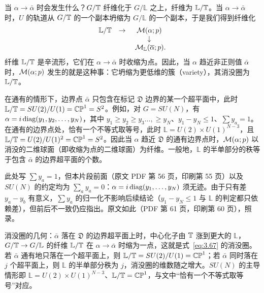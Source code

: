 当 $\alpha\to\bar\alpha$ 时会发生什么？$G/{\mathbb{T}}$ 纤维化于 $G/\mathbb{L}$ 之上，纤维为 $\mathbb{L}/{\mathbb{T}}$。当 $\alpha\to\bar\alpha$ 时，$U$ 的轨道从 $G/{\mathbb{T}}$ 的一个副本坍缩为 $G/\mathbb{L}$ 的一个副本，于是我们得到纤维化
\setcounter{equation}{66}
\begin{equation}\label{eq:3.67}
  \begin{matrix}\mathbb{L}/{\mathbb{T}}&\to& {\mathcal{M}}(\alpha;p)\\
                                &   & \downarrow \\
                                & & ~{\mathcal{M}}_\mathbb{L}(\overline\alpha;p). \end{matrix}
\end{equation}
纤维 $\mathbb{L}/{\mathbb{T}}$ 是辛流形，它们在 $\alpha\to\bar\alpha$ 时收缩为点。因此，当 $\alpha$ 趋近非正则值 $\bar\alpha$ 时，${\mathcal{M}}(\alpha;p)$ 发生的就是这种事：它坍缩为更低维的簇（variety），其消没圈为 $\mathbb{L}/{\mathbb{T}}$。

在通有的情形下，边界点 $\bar\alpha$ 只包含在标记 $\mathfrak{D}$ 边界的某一个超平面中，此时 $\mathbb{L}/{\mathbb{T}}=SU(2)/U(1)=\mathbb{CP}^1=S^2$。例如，对 $G=SU(N)$，有 $\alpha=i\,{\rm diag}(y_1,y_2,\dots,y_N)$，其中 $y_1\geq y_2\geq y_3\dots,\geq y_N$、$y_1-y_N\leq 1$、$\sum y_a=1$。在通有的边界点处，恰有一个不等式取等号，此时 $\mathbb{L}=U(2)\times U(1)^{N-3}$，且 $\mathbb{L}/{\mathbb{T}}=U(2)/U(1)^2=\mathbb{CP}^1=S^2$。因此当 $\alpha$ 趋近 $\mathfrak{D}$ 的通有边界点时，${\mathcal{M}}(\alpha;p)$ 以消没的二维球面（即收缩为点的二维球面）为纤维。一般地，$\mathbb{L}$ 的半单部分的秩等于包含 $\bar\alpha$ 的边界超平面的个数。

\begin{yizhu}[原文疑误]此处写 $\sum y_a=1$，但本片段前面（原文 PDF 第 56 页，印刷第 55 页）以及 $SU(N)$ 的约定均为 $\sum_a y_a=0$：$\alpha=i\,{\rm diag}(y_1,\dots,y_N)$ 须无迹。由于只有差 $y_a-y_b$ 有意义，$\sum y_a$ 的归一化不影响后续结论（$y_1-y_N\leq 1$ 与 $\mathbb{L}$ 的判定都只依赖差），但前后不一致仍应指出。原文如此（PDF 第 61 页，印刷第 60 页），照录。\end{yizhu}

\begin{yizhu}[物理图像补充]消没圈的几何：$\bar\alpha$ 落在 $\mathfrak D$ 的边界超平面上时，中心化子由 ${\mathbb{T}}$ 涨到更大的 $\mathbb{L}$，$G/{\mathbb{T}}\to G/\mathbb{L}$ 的纤维 $\mathbb{L}/{\mathbb{T}}$ 在 $\alpha\to\bar\alpha$ 时缩为一点，这就是式~\eqref{eq:3.67} 的消没圈。若 $\bar\alpha$ 通有地只落在一个超平面上，则 $\mathbb{L}/{\mathbb{T}}=SU(2)/U(1)=\mathbb{CP}^1$；若 $\bar\alpha$ 同时落在 $j$ 个超平面上，则 $\mathbb{L}$ 的半单部分秩为 $j$，消没圈的维数随之增大。$SU(N)$ 的主导情形即 $\mathbb{L}=U(2)\times U(1)^{N-3}$、$\mathbb{L}/{\mathbb{T}}=\mathbb{CP}^1$，与文中“恰有一个不等式取等号”对应。\end{yizhu}

